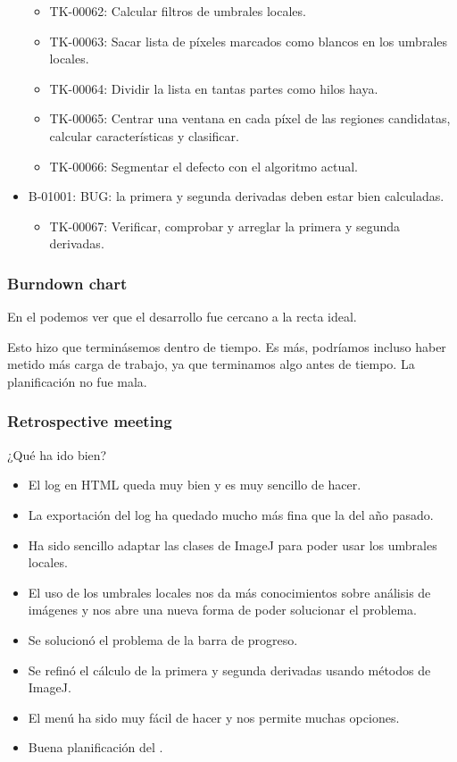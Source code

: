 \begin{itemize}
  \begin{itemize}
   \item TK-00062: Calcular filtros de umbrales locales.
   \item TK-00063: Sacar lista de píxeles marcados como blancos en los umbrales locales.
   \item TK-00064: Dividir la lista en tantas partes como hilos haya.
   \item TK-00065: Centrar una ventana en cada píxel de las regiones candidatas, calcular características y clasificar.
   \item TK-00066: Segmentar el defecto con el algoritmo actual.
  \end{itemize}
 \item B-01001: BUG: la primera y segunda derivadas deben estar bien calculadas.
  \begin{itemize}
   \item TK-00067: Verificar, comprobar y arreglar la primera y segunda derivadas.
  \end{itemize}
\end{itemize}

\subsubsection*{Burndown chart}
En el \burndownchart{}  podemos ver que el desarrollo fue cercano a la recta ideal.


Esto hizo que terminásemos dentro de tiempo. Es más, podríamos incluso haber metido más carga de trabajo, ya que terminamos algo antes de tiempo. La planificación no fue mala.

\subsubsection*{Retrospective meeting}
¿Qué ha ido bien?
\begin{itemize}
 \item El log en HTML queda muy bien y es muy sencillo de hacer.
 \item La exportación del log ha quedado mucho más fina que la del año pasado.
 \item Ha sido sencillo adaptar las clases de ImageJ para poder usar los umbrales locales.
 \item El uso de los umbrales locales nos da más conocimientos sobre análisis de imágenes y nos abre una nueva forma de poder solucionar el problema.
 \item Se solucionó el problema de la barra de progreso.
 \item Se refinó el cálculo de la primera y segunda derivadas usando métodos de ImageJ.
 \item El menú ha sido muy fácil de hacer y nos permite muchas opciones.
 \item Buena planificación del \sprint{}.
\end{itemize}

